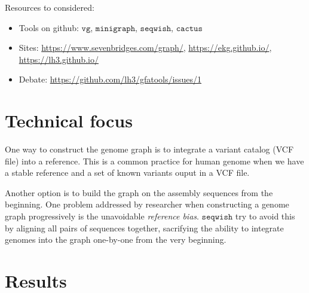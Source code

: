 \documentclass[10pt,twocolumn,twoside]{genpaper}
\newcommand{\vg}{$\mathtt{vg}$}
\newcommand{\mg}{$\mathtt{minigraph}$}
\newcommand{\sw}{$\mathtt{seqwish}$}
\begin{document}
Resources to considered:
\begin{itemize}
\item Tools on github: \vg{}, \mg{}, \sw{}, $\mathtt{cactus}$
\item Sites: \url{https://www.sevenbridges.com/graph/}, \url{https://ekg.github.io/}, \url{https://lh3.github.io/}
\item Debate: \url{https://github.com/lh3/gfatools/issues/1}
\end{itemize}
\section*{Technical focus}
One way to construct the genome graph is to integrate a variant catalog (VCF file) into a reference. This is a common practice for human genome when we have a stable reference and a set of known variants ouput in a VCF file.

Another option is to build the graph on the assembly sequences from the beginning.
One problem addressed by researcher when constructing a genome graph progressively is the unavoidable \emph{reference bias}.
\sw{} try to avoid this by aligning all pairs of sequences together, sacrifying the ability to integrate genomes into the graph one-by-one from the very beginning.
\section*{Results}


 
\end{document}
